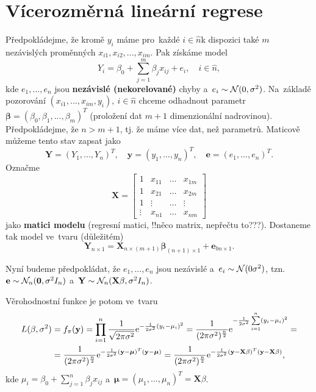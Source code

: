 \chapter{Vícerozměrná lineární regrese}

Předpokládejme, že kromě $y_i$ máme pro~každé $i\in\hat{n}$k dispozici také $m$ nezávislých proměnných $x_{i1},x_{i2},...,x_{im}$. Pak získáme model
$$ Y_i=\beta_0+\sum_{j=1}^m \beta_j x_{ij}+e_i,\quad i\in\hat{n},$$
kde $e_1,...,e_n$ jsou \textbf{nezávislé (nekorelované)} chyby a~$e_i\sim\mathcal{N}(0,\sigma^2)$. Na~základě pozorování $(x_{i1},...,x_{im},y_i),~i\in\hat{n}$ chceme odhadnout parametr $\boldsymbol{\beta}=(\beta_0,\beta_1,...,\beta_m)^T$ (proložení dat $m+1$ dimenzionální nadrovinou). Předpokládejme, že $n>m+1$, tj. že máme více dat, než parametrů. Maticově můžeme tento stav zapsat jako
$$ \textbf{Y}=(Y_1,...,Y_n)^T,\quad \textbf{y}=(y_1,...,y_n)^T,\quad \textbf{e}=(e_1,...,e_n)^T.$$
Označme 
$$ \textbf{X}=\left[ \begin{array}{cccc}
1 & x_{11} & \dots & x_{1m} \\
1 & x_{21} & \dots & x_{2m} \\
1 & \vdots & \dots & \vdots \\
 \vdots& x_{n1} & \dots & x_{nm} 
\end{array}
 \right]$$ jako \textbf{matici modelu} (regresní matici, !!něco matrix, nepřečtu to???). Dostaneme tak model ve~tvaru (důležitém)
  \begin{equation}\label{the_chosen_one}
 \textbf{Y}_{n\times 1}=\textbf{X}_{n\times(m+1)}\boldsymbol{\beta}_{(n+1)\times 1}+\textbf{e}_{bn\times 1}.
 \end{equation}
 
 Nyní budeme předpokládat, že $e_1,...,e_n$ jsou nezávislé a~$e_i \sim\mathcal{N}(0\sigma^2)$, tzn. $\textbf{e}\sim\mathcal{N}_n(\textbf{0},\sigma^2 I_n)$ a~$\textbf{Y}\sim\mathcal{N}_n(\textbf{X}\beta,\sigma^2 I_n)$. 
 
 Věrohodnostní funkce je potom ve~tvaru 
 \[
 \begin{split}
 L(\beta,\sigma^2)&=f_\pi(\textbf{y})=\prod_{i=1}^n \frac{1}{\sqrt{2\pi\sigma^2}}\mathrm{e}^{-\frac{1}{2\sigma^2}(y_i-\mu_i)^2}=\frac{1}{(2\pi\sigma^2)^{\frac{n}{2}}}\mathrm{e}^{-\frac{1}{2\sigma^2}\sum\limits_{i=1}^{n} (y_i-\mu_i)^2}= \\ &=\frac{1}{(2\pi\sigma^2)^{\frac{n}{2}}}\mathrm{e}^{-\frac{1}{2\sigma^2}(\textbf{y}-\boldsymbol{\mu})^T(\textbf{y}-\boldsymbol{\mu})}=\frac{1}{(2\pi\sigma^2)^{\frac{n}{2}}}\mathrm{e}^{-\frac{1}{2\sigma^2}(\textbf{y}-\textbf{X}\beta)^T(\textbf{y}-\textbf{X}\beta)},
 \end{split}
 \] kde $\mu_i=\beta_0+\sum_{j=1}^n \beta_j x_{ij}$ a~$\boldsymbol{\mu}=(\mu_1,...,\mu_n)^T=\textbf{X}\beta$.
 
